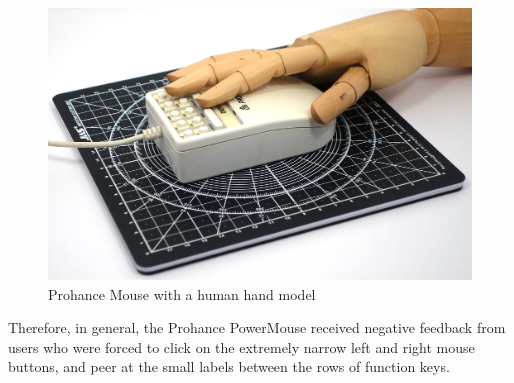 \documentclass[11pt, a4paper]{article}
\begin{document}
\begin{figure}[h]
    \centering
    \includegraphics[scale=0.4]{1989_prohance_powermouse/hand_30.jpg}
    \caption{Prohance Mouse with a human hand model}
    \label{fig:ProhanceHand}
\end{figure}

Therefore, in general, the Prohance PowerMouse received negative feedback from users who were forced to click on the extremely narrow left and right mouse buttons, and peer at the small labels between the rows of function keys.
\end{document}
